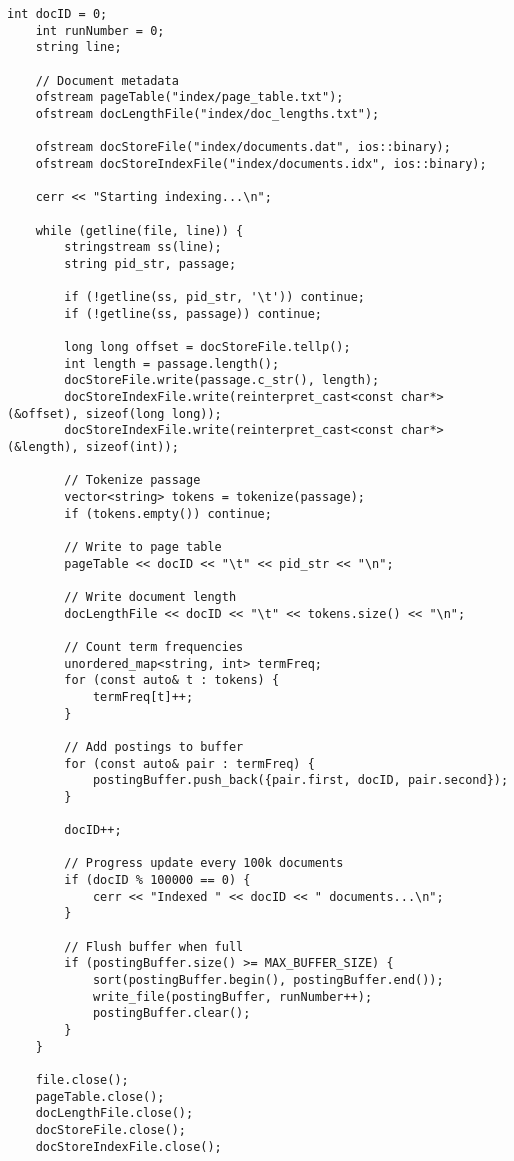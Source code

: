 \documentclass{article}
\begin{document}
\begin{lstlisting}[caption={The complete source code for the indexer component.}, label={lst:indexer}]
    int docID = 0;
    int runNumber = 0;
    string line;
    
    // Document metadata
    ofstream pageTable("index/page_table.txt");
    ofstream docLengthFile("index/doc_lengths.txt");

    ofstream docStoreFile("index/documents.dat", ios::binary);
    ofstream docStoreIndexFile("index/documents.idx", ios::binary);

    cerr << "Starting indexing...\n";

    while (getline(file, line)) {
        stringstream ss(line);
        string pid_str, passage;
        
        if (!getline(ss, pid_str, '\t')) continue;
        if (!getline(ss, passage)) continue;

        long long offset = docStoreFile.tellp();
        int length = passage.length();
        docStoreFile.write(passage.c_str(), length);
        docStoreIndexFile.write(reinterpret_cast<const char*>(&offset), sizeof(long long));
        docStoreIndexFile.write(reinterpret_cast<const char*>(&length), sizeof(int));

        // Tokenize passage
        vector<string> tokens = tokenize(passage);
        if (tokens.empty()) continue;

        // Write to page table
        pageTable << docID << "\t" << pid_str << "\n";
        
        // Write document length
        docLengthFile << docID << "\t" << tokens.size() << "\n";

        // Count term frequencies
        unordered_map<string, int> termFreq;
        for (const auto& t : tokens) {
            termFreq[t]++;
        }

        // Add postings to buffer
        for (const auto& pair : termFreq) {
            postingBuffer.push_back({pair.first, docID, pair.second});
        }

        docID++;

        // Progress update every 100k documents
        if (docID % 100000 == 0) {
            cerr << "Indexed " << docID << " documents...\n";
        }

        // Flush buffer when full
        if (postingBuffer.size() >= MAX_BUFFER_SIZE) {
            sort(postingBuffer.begin(), postingBuffer.end());
            write_file(postingBuffer, runNumber++);
            postingBuffer.clear();
        }
    }

    file.close();
    pageTable.close();
    docLengthFile.close();
    docStoreFile.close();
    docStoreIndexFile.close();
   

\end{lstlisting}
\end{document}
